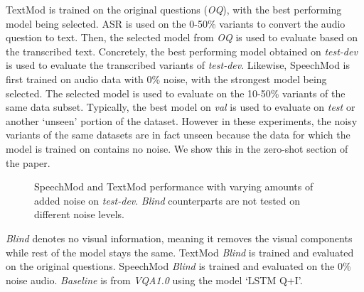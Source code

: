 \documentclass[letterpaper]{article} %
\begin{document}
TextMod is trained on the original questions (\textit{OQ}), with the best performing model being selected. ASR is used on the 0-50\% variants to convert the audio question to text. Then, the selected model from \textit{OQ} is used to evaluate based on the transcribed text. Concretely, the best performing model obtained on \textit{test-dev} is used to evaluate the transcribed variants of \textit{test-dev}. Likewise, SpeechMod is first trained on audio data with 0\% noise, with the strongest model being selected. The selected model is used to evaluate on the 10-50\% variants of the same data subset. Typically, the best model on \textit{val} is used to evaluate on \textit{test} or another `unseen' portion of the dataset. However in these experiments, the noisy variants of the same datasets are in fact unseen because the data for which the model is trained on contains no noise. We show this in the zero-shot section of the paper.


\pgfplotsset{width=8cm,compat=1.9}
\begin{figure}[t]
\centering
{}
\caption{SpeechMod and TextMod performance with varying amounts of added noise on \textit{test-dev}. \textit{Blind} counterparts are not tested on different noise levels.}
\label{fig:noiseplots}
\end{figure}


\textit{Blind} denotes no visual information, meaning it removes the visual components while rest of the model stays the same. TextMod \textit{Blind} is trained and evaluated on the original questions. SpeechMod \textit{Blind} is trained and evaluated on the 0\% noise audio. \textit{Baseline} is from \textit{VQA1.0} using the model `LSTM Q+I'.
\end{document}
